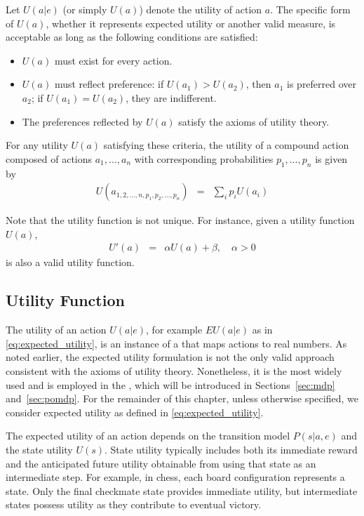 \begin{mdframed}
	Let $U(a|e)$ (or simply $U(a)$) denote the utility of action $a$. The specific form of $U(a)$, whether it represents expected utility or another valid measure, is acceptable as long as the following conditions are satisfied:
	\begin{itemize}
		\item $U(a)$ must exist for every action.
		\item $U(a)$ must reflect preference: if $U(a_1) > U(a_2)$, then $a_1$ is preferred over $a_2$; if $U(a_1) = U(a_2)$, they are indifferent.
		\item The preferences reflected by $U(a)$ satisfy the axioms of utility theory.
	\end{itemize}
	
	For any utility $U(a)$ satisfying these criteria, the utility of a compound action composed of actions $a_1, \dots, a_n$ with corresponding probabilities $p_1, \dots, p_n$ is given by
	\begin{eqnarray}
		U(a_{1,2,\dots,n,p_1,p_2,\dots,p_n}) &=& \sum_i p_i U(a_i) \nonumber
	\end{eqnarray}
	
	Note that the utility function is not unique. For instance, given a utility function $U(a)$,
	\begin{eqnarray}
		U'(a) &=& \alpha U(a) + \beta, \quad \alpha > 0 \nonumber
	\end{eqnarray}
	is also a valid utility function.
	
\end{mdframed}

\subsection{Utility Function}

The utility of an action $U(a|e)$, for example $EU(a|e)$ as in \eqref{eq:expected_utility}, is an instance of a  that maps actions to real numbers. As noted earlier, the expected utility formulation is not the only valid approach consistent with the axioms of utility theory. Nonetheless, it is the most widely used and is employed in the , which will be introduced in Sections~\ref{sec:mdp} and~\ref{sec:pomdp}. For the remainder of this chapter, unless otherwise specified, we consider expected utility as defined in \eqref{eq:expected_utility}.

The expected utility of an action depends on the transition model $P(s|a,e)$ and the state utility $U(s)$. State utility typically includes both its immediate reward and the anticipated future utility obtainable from using that state as an intermediate step. For example, in chess, each board configuration represents a state. Only the final checkmate state provides immediate utility, but intermediate states possess utility as they contribute to eventual victory.


